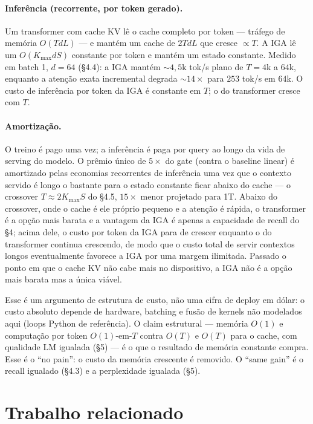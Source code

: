 \documentclass[11pt]{article}
\begin{document}
\paragraph{Infer\^encia (recorrente, por token gerado).} Um transformer com
cache KV l\^e o cache completo por token --- tr\'afego de mem\'oria $O(TdL)$ ---
e mant\'em um cache de $2TdL$ que cresce $\propto T$. A IGA l\^e um
$O(K_{\max}dS)$ constante por token e mant\'em um estado constante. Medido em
batch 1, $d=64$ (\S4.4): a IGA mant\'em $\sim$$4{,}5$k tok/s plano de $T=4$k a
$64$k, enquanto a aten\c{c}\~ao exata incremental degrada $\sim$$14\times$ para
$253$ tok/s em $64$k. O custo de infer\^encia por token da IGA \'e constante em
$T$; o do transformer cresce com $T$.

\paragraph{Amortiza\c{c}\~ao.} O treino \'e pago uma vez; a infer\^encia \'e paga
por query ao longo da vida de serving do modelo. O pr\^emio \'unico de $5\times$
do gate (contra o baseline linear) \'e amortizado pelas economias recorrentes de
infer\^encia uma vez que o contexto servido \'e longo o bastante para o estado
constante ficar abaixo do cache --- o crossover $T\approx 2K_{\max}S$ do \S4.5,
$15\times$ menor projetado para 1T. Abaixo do crossover, onde o cache \'e ele
pr\'oprio pequeno e a aten\c{c}\~ao \'e r\'apida, o transformer \'e a op\c{c}\~ao
mais barata e a vantagem da IGA \'e apenas a capacidade de recall do \S4; acima
dele, o custo por token da IGA para de crescer enquanto o do transformer continua
crescendo, de modo que o custo total de servir contextos longos eventualmente
favorece a IGA por uma margem ilimitada. Passado o ponto em que o cache KV n\~ao
cabe mais no dispositivo, a IGA n\~ao \'e a op\c{c}\~ao mais barata mas a \'unica
vi\'avel.

Esse \'e um argumento de estrutura de custo, n\~ao uma cifra de deploy em
d\'olar: o custo absoluto depende de hardware, batching e fus\~ao de kernels n\~ao
modelados aqui (loops Python de refer\^encia). O claim estrutural ---
mem\'oria $O(1)$ e computa\c{c}\~ao por token $O(1)$-em-$T$ contra $O(T)$ e
$O(T)$ para o cache, com qualidade LM igualada (\S5) --- \'e o que o resultado de
mem\'oria constante compra. Esse \'e o ``no pain'': o custo da mem\'oria
crescente \'e removido. O ``same gain'' \'e o recall igualado (\S4.3) e a
perplexidade igualada (\S5).

\section{Trabalho relacionado}
\end{document}
